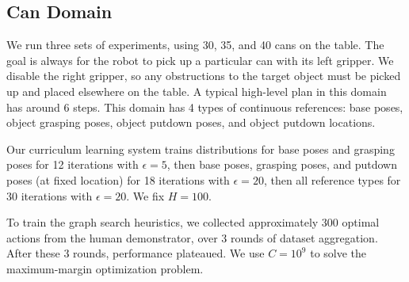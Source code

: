 \subsection{Can Domain}
We run three sets of experiments, using 30, 35, and 40 cans on the
table.  The goal is always for the robot to pick up a particular can
with its left gripper. We disable the right gripper, so any
obstructions to the target object must be picked up and placed
elsewhere on the table. A typical high-level plan in this domain has around 6 steps.
This domain has 4 types of continuous
references: base poses, object grasping poses, object putdown poses,
and object putdown locations.

Our curriculum learning system trains distributions for base poses and
grasping poses for 12 iterations with $\epsilon = 5$, then base poses,
grasping poses, and putdown poses (at fixed location) for 18
iterations with $\epsilon = 20$, then all reference types for 30
iterations with $\epsilon = 20$. We fix $H = 100$.

To train the graph search heuristics, we collected approximately 300
optimal actions from the human demonstrator, over 3 rounds of dataset aggregation.
After these 3 rounds, performance plateaued. We use $C =
10^{9}$ to solve the maximum-margin optimization problem.

